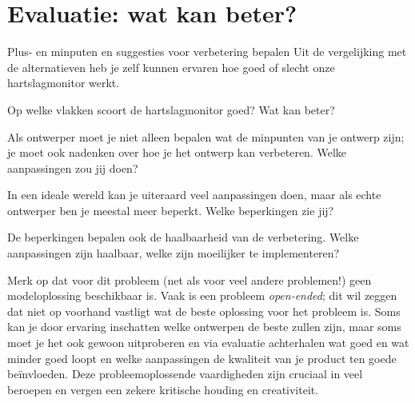 \section{Evaluatie: wat kan beter?}
\label{sec:Mod6_Sec3}
%
\begin{opdracht}{Plus- en minputen en suggesties voor verbetering bepalen}
	Uit de vergelijking met de alternatieven heb je zelf kunnen ervaren hoe goed of slecht onze hartslagmonitor werkt. 

\begin{steroef}
	Op welke vlakken scoort de hartslagmonitor goed?
Wat kan beter? 
\end{steroef}

\begin{steroef}
	Als ontwerper moet je niet alleen bepalen wat de minpunten van je ontwerp zijn; je moet ook nadenken over hoe je het ontwerp kan verbeteren. Welke aanpassingen zou jij doen?
\end{steroef}

\begin{steroef}
	In een ideale wereld kan je uiteraard veel aanpassingen doen, maar als echte ontwerper ben je meestal meer beperkt. Welke beperkingen zie jij? 
\end{steroef}

\begin{steroef}
	De beperkingen bepalen ook de haalbaarheid van de verbetering. Welke aanpassingen zijn haalbaar, welke zijn moeilijker te implementeren?
\end{steroef}

\begin{opmerking}
	Merk op dat voor dit probleem (net als voor veel andere problemen!) geen modeloplossing beschikbaar is. Vaak is een probleem \emph{open-ended}; dit wil zeggen dat niet op voorhand vastligt wat de beste oplossing voor het probleem is. Soms kan je door ervaring inschatten welke ontwerpen de beste zullen zijn, maar soms moet je het ook gewoon uitproberen en via evaluatie achterhalen wat goed en wat minder goed loopt en welke aanpassingen de kwaliteit van je product ten goede be\"invloeden. Deze probleemoplossende vaardigheden zijn cruciaal in veel beroepen en vergen een zekere kritische houding en creativiteit.
\end{opmerking}
\end{opdracht}
